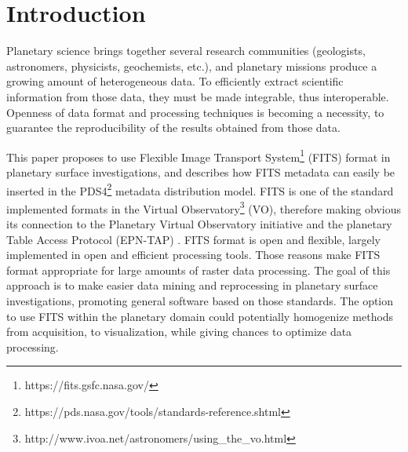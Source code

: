 

% 
% 
% 


\section{Introduction}
\label{sec:intro}
Planetary science brings together several research communities
(geologists, astronomers, physicists, geochemists, etc.),
and planetary missions produce a growing amount of heterogeneous data.
To efficiently extract scientific information from those data, they must
be made integrable, thus interoperable.
Openness of data format and processing techniques is becoming a necessity,
to guarantee the reproducibility of the results obtained from those data.

This paper proposes to use Flexible Image Transport
System\footnote{https://fits.gsfc.nasa.gov/}
(FITS) format \citep{fitsorig,fitsver3} in planetary surface investigations,
and describes how FITS metadata can easily be inserted in the
PDS4\footnote{https://pds.nasa.gov/tools/standards-reference.shtml}
metadata distribution model.
FITS is one of the standard implemented formats in the Virtual
Observatory\footnote{http://www.ivoa.net/astronomers/using\_the\_vo.html}
(VO), therefore making obvious its connection to the Planetary Virtual
Observatory initiative and the planetary Table Access Protocol (EPN-TAP)
\citep{ERARDepntap}.
FITS format is open and flexible, largely implemented in open and efficient
processing tools.
Those reasons make FITS format appropriate for large amounts of raster data
processing.
The goal of this approach is to make easier data mining and reprocessing
in planetary surface investigations, promoting general software based on those
standards.
The option to use FITS within the planetary domain could potentially
homogenize methods from acquisition, to visualization, while
giving chances to optimize data processing.

